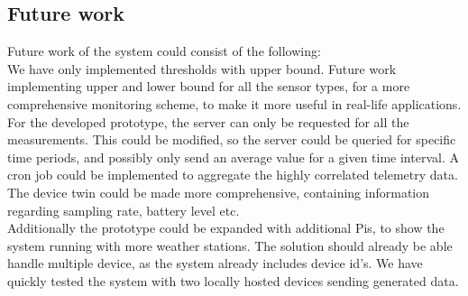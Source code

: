 \subsection*{Future work}
Future work of the system could consist of the following:\\
We have only implemented thresholds with upper bound. Future work implementing upper and lower bound for all the sensor types, for a more comprehensive monitoring scheme, to make it more useful in real-life applications.\\
For the developed prototype, the server can only be requested for all the measurements. This could be modified, so the server could be queried for specific time periods, and possibly only send an average value for a given time interval. A cron job could be implemented to aggregate the highly correlated telemetry data. \\
The device twin could be made more comprehensive, containing information regarding sampling rate, battery level etc.\\
Additionally the prototype could be expanded with additional Pis, to show the system running with more weather stations. The solution should already be able handle multiple device, as the system already includes device id's. We have quickly tested the system with two locally hosted devices sending generated data.\\ 
